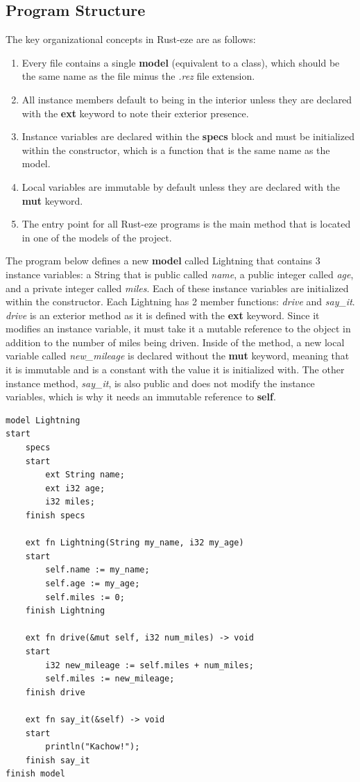 \documentclass[letterpaper, 10pt, DIV=13]{scrartcl}
\numberwithin{equation}{section}
\numberwithin{figure}{section}
\numberwithin{table}{section}
\begin{document}
\subsection{Program Structure}
The key organizational concepts in Rust-eze are as follows:
\begin{enumerate}
    \item Every file contains a single \textbf{model} (equivalent to a class),
          which should be the same name as the file minus the \textit{.rez} file
          extension.
    \item All instance members default to being in the interior unless they 
          are declared with the \textbf{ext} keyword to note their exterior presence.
    \item Instance variables are declared within the \textbf{specs} block and
          must be initialized within the constructor, which is a function that
          is the same name as the model.
    \item Local variables are immutable by default unless they are declared with
          the \textbf{mut} keyword.
    \item The entry point for all Rust-eze programs is the main method that is
          located in one of the models of the project.
\end{enumerate}

The program below defines a new \textbf{model} called Lightning that contains
3 instance variables: a String that is public called \textit{name}, a public
integer called \textit{age}, and a private integer called \textit{miles}. Each
of these instance variables are initialized within the constructor. Each
Lightning has 2 member functions: \textit{drive} and \textit{say\_it}.
\textit{drive} is an exterior method as it is defined with the \textbf{ext}
keyword. Since it modifies an instance variable, it must take it a mutable
reference to the object in addition to the number of miles being driven. Inside
of the method, a new local variable called \textit{new\_mileage} is declared
without the \textbf{mut} keyword, meaning that it is immutable and is a constant
with the value it is initialized with. The other instance method,
\textit{say\_it}, is also public and does not modify the instance variables,
which is why it needs an immutable reference to \textbf{self}.

\begin{lstlisting}[caption = Lightning.rez, frame = single, nolol]
model Lightning
start
    specs
    start
        ext String name;
        ext i32 age;
        i32 miles;
    finish specs

    ext fn Lightning(String my_name, i32 my_age)
    start
        self.name := my_name;
        self.age := my_age;
        self.miles := 0;
    finish Lightning

    ext fn drive(&mut self, i32 num_miles) -> void
    start
        i32 new_mileage := self.miles + num_miles;
        self.miles := new_mileage;
    finish drive

    ext fn say_it(&self) -> void
    start
        println("Kachow!");
    finish say_it
finish model
\end{lstlisting}
\end{document}
